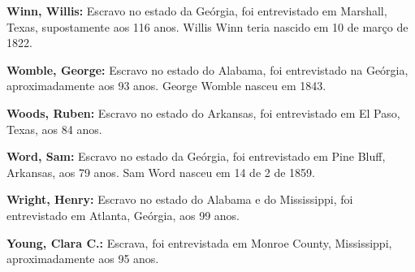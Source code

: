 \textbf{Winn, Willis:} Escravo no estado da Geórgia, foi entrevistado em
Marshall, Texas, supostamente aos 116 anos. Willis Winn teria nascido em
10 de março de 1822.

\textbf{Womble, George:} Escravo no estado do Alabama, foi entrevistado
na Geórgia, aproximadamente aos 93 anos. George Womble nasceu em 1843.

\textbf{Woods, Ruben:} Escravo no estado do Arkansas, foi entrevistado
em El Paso, Texas, aos 84 anos.

\textbf{Word, Sam:} Escravo no estado da Geórgia, foi entrevistado em
Pine Bluff, Arkansas, aos 79 anos. Sam Word nasceu em 14 de 2 de 1859.

\textbf{Wright, Henry:} Escravo no estado do Alabama e do Mississippi,
foi entrevistado em Atlanta, Geórgia, aos 99 anos.

\textbf{Young, Clara C.:} Escrava, foi entrevistada em Monroe County,
Mississippi, aproximadamente aos 95 anos.
